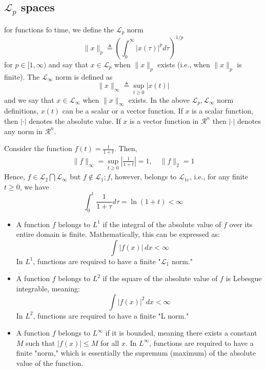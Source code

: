 \documentclass[10pt]{article}
\begin{document}
\begin{multicols*}{2}
\subsection{$\mathcal{L}_p$ spaces} 
for functions fo time, we define the $\mathcal{L}_p$ norm
\begin{equation*}
    \|x\|_p \triangleq\left(\int_0^{\infty}|x(\tau)|^p d \tau\right)^{1 / p}
\end{equation*}
for $p \in[1, \infty)$ and say that $x \in \mathcal{L}_p$ when $\|x\|_p$ exists (i.e., when $\|x\|_p$ is finite). The $\mathcal{L}_{\infty}$ norm is defined as
$$
\|x\|_{\infty} \triangleq \sup _{t \geq 0}|x(t)|
$$
and we say that $x \in \mathcal{L}_{\infty}$ when $\|x\|_{\infty}$ exists.
In the above $\mathcal{L}_p, \mathcal{L}_{\infty}$ norm definitions, $x(t)$ can be a scalar or a vector function. If $x$ is a scalar function, then $|\cdot|$ denotes the absolute value. If $x$ is a vector function in $\mathcal{R}^n$ then $|\cdot|$ denotes any norm in $\mathcal{R}^n$.
\begin{frm-ex}
Consider the function $f(t)=\frac{1}{1+t}$. Then,
$$
\begin{gathered}
\|f\|_{\infty}=\sup _{t \geq 0}\left|\frac{1}{1+t}\right|=1, \quad\|f\|_2=1
\end{gathered}
$$
Hence, $f \in \mathcal{L}_2 \bigcap \mathcal{L}_{\infty}$ but $f \notin \mathcal{L}_1 ; f$, however, belongs to $\mathcal{L}_{1 e}$, i.e., for any finite $t \geq 0$, we have
$$
\int_0^t \frac{1}{1+\tau} d \tau=\ln (1+t)<\infty
$$
\end{frm-ex}    
\begin{itemize}
        \item A function $f$ belongs to $L^1$ if the integral of the absolute value of $f$ over its entire domain is finite. Mathematically, this can be expressed as:
        \[ \int |f(x)| \, dx < \infty \]
        In $L^1$, functions are required to have a finite "$\mathcal{L}_1$  norm."
        \item  A function $f$ belongs to $L^2$ if the square of the absolute value of $f$ is Lebesgue integrable, meaning:
        \[ \int |f(x)|^2 \, dx < \infty \]
        In $L^2$, functions are required to have a finite "L norm."
        \item A function $f$ belongs to $L^\infty$ if it is bounded, meaning there exists a constant $M$ such that $|f(x)| \leq M$ for all $x$. In $L^\infty$, functions are required to have a finite "norm," which is essentially the supremum (maximum) of the absolute value of the function.
\end{itemize}

\end{multicols*}
\end{document}
